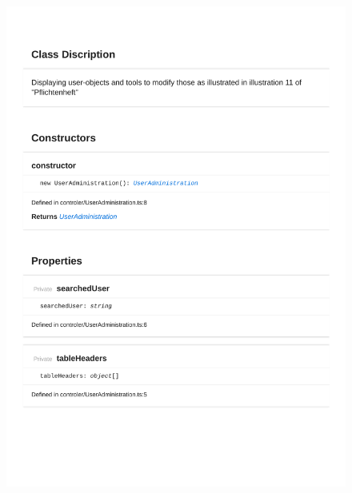 \begin{figure}[H]
\centerline{\includegraphics[width=1\textwidth]{FrontendDocsAsPDF/Model/UserAdministration.pdf}}
\end{figure}

